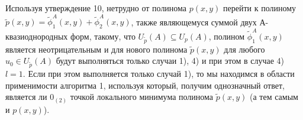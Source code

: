 \documentclass[11pt,reqno]{amsart}
\theoremstyle{plain}
\theoremstyle{definition}
\begin{document}
Используя утверждение 10, нетрудно от полинома $p(x,y)$ перейти к полиному $\tilde{p}(x,y) = \tilde{\phi}^A_1(x,y)+\tilde{\phi}^A_2(x,y)$, также являющемуся суммой двух А-квазиоднородных форм, такому, что $U_{\tilde{p}}(A) \subseteq U_p (A)$, полином $\tilde{\phi}^A_1(x,y)$ является неотрицательным  и для
нового полинома $\tilde{p}(x,y)$ для любого $u_0 \in U_{\tilde{p}}(A)$ будут выполняться только случаи 1), 4) и при этом в случае 4) $l = 1$. Если при этом выполняется только случай 1), то мы находимся в области применимости алгоритма 1, используя который, получим однозначный ответ, является ли $0_{(2)}$ точкой локального минимума полинома $\tilde{p}(x,y)$ (а тем самым и $p(x,y)$).



\label{lastpage}  %
\end{document}
